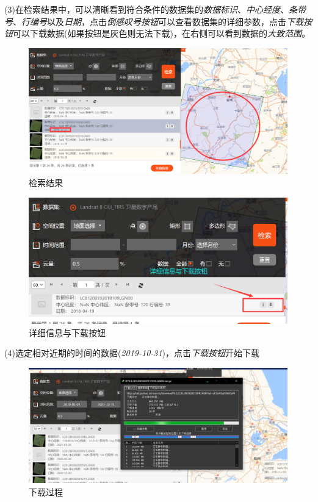 \documentclass[12pt,a4paper]{article}
\begin{document}
	(3)在检索结果中，可以清晰看到符合条件的数据集的\textit{数据标识}、\textit{中心经度}、\textit{条带号}、\textit{行编号}以及\textit{日期}，点击\textit{倒感叹号按钮}可以查看数据集的详细参数，点击\textit{下载按钮}可以下载数据(如果按钮是灰色则无法下载)，在右侧可以看到数据的\textit{大致范围}。
	
	\begin{figure}[H]
		\centering
		\includegraphics[width=.7\textwidth]{web_select2}
		\caption{检索结果}
		\label{fig:web3}
	\end{figure}
	\begin{figure}[H]
		\centering
		\includegraphics[width=.7\textwidth]{3}
		\caption{详细信息与下载按钮}
		\label{fig:web4}
	\end{figure}
	
	
	(4)选定相对近期的时间的数据(\textit{2019-10-31})，点击\textit{下载按钮}开始下载
	
	\begin{figure}[H]
		\centering
		\includegraphics[width=.7\textwidth]{2}
		\caption{下载过程}
		\label{fig:web4}
	\end{figure}
	

	
	
\end{document}
